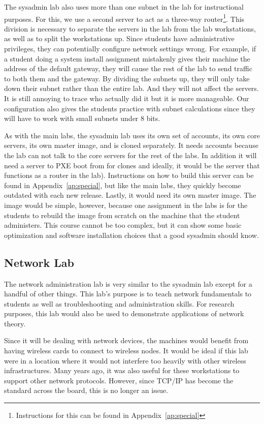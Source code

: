 The sysadmin lab also uses more than one subnet in the lab for instructional purposes.  For this, we use a second server to act as a three-way router\footnote{Instructions for this can be found in Appendix~\ref{ap:special}}.  This division is necessary to separate the servers in the lab from the lab workstations, as well as to split the workstations up.  Since students have administrative privileges, they can potentially configure network settings wrong.  For example, if a student doing a system install assignment mistakenly gives their machine the address of the default gateway, they will cause the rest of the lab to send traffic to both them and the gateway.  By dividing the subnets up, they will only take down their subnet rather than the entire lab.  And they will not affect the servers.  It is still annoying to trace who actually did it but it is more manageable.  Our configuration also gives the students practice with subnet calculations since they will have to work with small subnets under 8 bits.

As with the main labs, the sysadmin lab uses its own set of accounts, its own core servers, its own master image, and is cloned separately.  It needs accounts because the lab can not talk to the core servers for the rest of the labs.  In addition it will need a server to PXE boot from for clones and ideally, it would be the server that functions as a router in the lab).  Instructions on how to build this server can be found in Appendix~\ref{ap:special}, but like the main labs, they quickly become outdated with each new release.  Lastly, it would need its own master image.  The image would be simple, however, because one assignment in the labs is for the students to rebuild the image from scratch on the machine that the student administers.  This course cannot be too complex, but it can show some basic optimization and software installation choices that a good sysadmin should know.  
\subsection{Network Lab}
The network administration lab is very similar to the sysadmin lab except for a handful of other things.  This lab's purpose is to teach network fundamentals to students as well as troubleshooting and administration skills.  For research purposes, this lab would also be used to demonstrate applications of network theory.  

Since it will be dealing with network devices, the machines would benefit from having wireless cards to connect to wireless nodes.  It would be ideal if this lab were in a location where it would not interfere too heavily with other wireless infrastructures.  Many years ago, it was also useful for these workstations to support other network protocols.  However, since TCP/IP has become the standard across the board, this is no longer an issue.  

